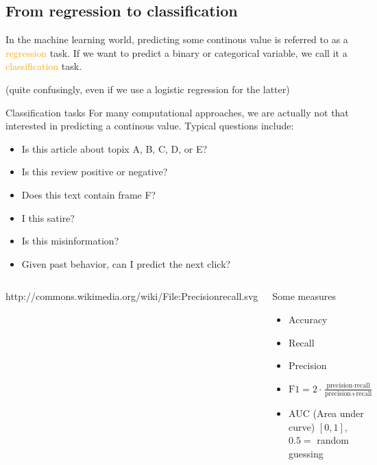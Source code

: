 \subsection{From regression to classification}
	
\begin{frame}[standout]
In the machine learning world, predicting some continous value is referred to as a \textcolor{orange}{regression} task. If we want to predict a binary or categorical variable, we call it a \textcolor{orange}{classification} task.

(quite confusingly, even if we use a logistic regression for the latter)
\end{frame}


\begin{frame}{Classification tasks}
For many computational approaches, we are actually not that interested in predicting a continous value. Typical questions include:
\begin{itemize}
	\item Is this article about topix A, B, C, D, or E?
	\item Is this review positive or negative?
	\item Does this text contain frame F?
	\item I this satire? 
	\item Is this misinformation?
	\item Given past behavior, can I predict the next click?
\end{itemize}
\end{frame}



\begin{frame}[plain]
	\begin{columns}[]
		
		{\tiny{http://commons.wikimedia.org/wiki/File:Precisionrecall.svg}}
		
		\begin{block}{Some measures}
			\begin{itemize}
				\item Accuracy
				\item Recall
				\item Precision
				\item $\text{F1}=2\cdot \frac{\text{precision}\cdot \text{recall}}{\text{precision}+\text{recall}}$
				\item AUC (Area under curve) $[0,1]$, $0.5=$ random guessing
			\end{itemize}
		\end{block}
		
		
	\end{columns}
	
\end{frame}





